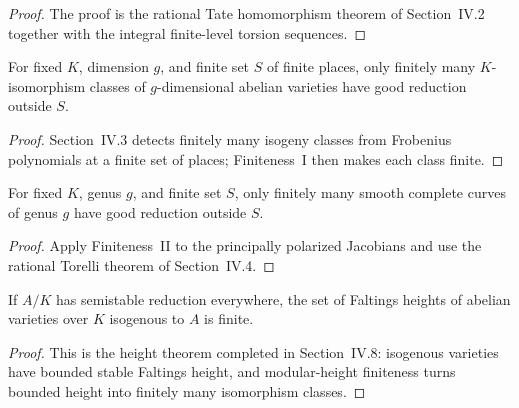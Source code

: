 \begin{proof}

The proof is the rational Tate homomorphism theorem of Section~IV.2 together
with the integral finite-level torsion sequences.

\end{proof}


\begin{theorem}[Finiteness II]
\label{thm:milne-finiteness-II}

For fixed $K$, dimension $g$, and finite set $S$ of finite places, only
finitely many $K$-isomorphism classes of $g$-dimensional abelian varieties have
good reduction outside $S$.
\end{theorem}

\begin{proof}

Section~IV.3 detects finitely many isogeny classes from Frobenius polynomials at
a finite set of places; Finiteness~I then makes each class finite.

\end{proof}


\begin{theorem}
\label{thm:milne-finiteness-shafarevich}

For fixed $K$, genus $g$, and finite set $S$, only finitely many smooth complete
curves of genus $g$ have good reduction outside $S$.
\end{theorem}

\begin{proof}

Apply Finiteness~II to the principally polarized Jacobians and use the rational
Torelli theorem of Section~IV.4.

\end{proof}


\begin{theorem}
\label{thm:milne-finiteness-height}

If $A/K$ has semistable reduction everywhere, the set of Faltings heights of
abelian varieties over $K$ isogenous to $A$ is finite.
\end{theorem}

\begin{proof}

This is the height theorem completed in Section~IV.8: isogenous varieties have
bounded stable Faltings height, and modular-height finiteness turns bounded
height into finitely many isomorphism classes.

\end{proof}


